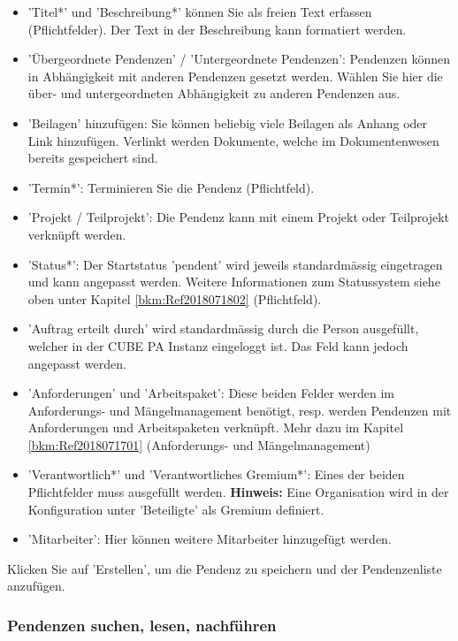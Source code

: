 \begin{itemize}
\item
'Titel*' und 'Beschreibung*' können Sie als freien Text erfassen (Pflichtfelder). Der Text in der Beschreibung kann formatiert werden.
\item
'Übergeordnete Pendenzen' / 'Untergeordnete Pendenzen': Pendenzen können in Abhängigkeit mit anderen Pendenzen gesetzt werden. Wählen Sie hier die über- und untergeordneten Abhängigkeit zu anderen Pendenzen aus.
\item 
'Beilagen' hinzufügen: Sie können beliebig viele Beilagen als Anhang oder Link hinzufügen. Verlinkt werden Dokumente, welche im Dokumentenwesen bereits gespeichert sind.
\item
'Termin*': Terminieren Sie die Pendenz (Pflichtfeld).
\item
'Projekt / Teilprojekt': Die Pendenz kann mit einem Projekt oder Teilprojekt verknüpft werden.
\item
'Status*': Der Startstatus 'pendent' wird jeweils standardmässig eingetragen und kann angepasst werden. Weitere Informationen zum Statussystem siehe oben unter Kapitel \ref{bkm:Ref2018071802} (Pflichtfeld).
\item
'Auftrag erteilt durch' wird standardmässig durch die Person ausgefüllt, welcher in der CUBE PA Instanz eingeloggt ist. Das Feld kann jedoch angepasst werden.
\item
'Anforderungen' und 'Arbeitspaket': Diese beiden Felder werden im Anforderungs- und Mängelmanagement benötigt, resp. werden Pendenzen mit Anforderungen und Arbeitspaketen verknüpft. Mehr dazu im Kapitel \ref{bkm:Ref2018071701} (Anforderungs- und Mängelmanagement)
\item
'Verantwortlich*' und 'Verantwortliches Gremium*': Eines der beiden Pflichtfelder muss ausgefüllt werden. \textbf{Hinweis:} Eine Organisation wird in der Konfiguration unter 'Beteiligte' als Gremium definiert.
\item
'Mitarbeiter': Hier können weitere Mitarbeiter hinzugefügt werden.
\end{itemize}

Klicken Sie auf 'Erstellen', um die Pendenz zu speichern und der Pendenzenliste anzufügen.

\subsubsection{Pendenzen suchen, lesen, nachführen}

